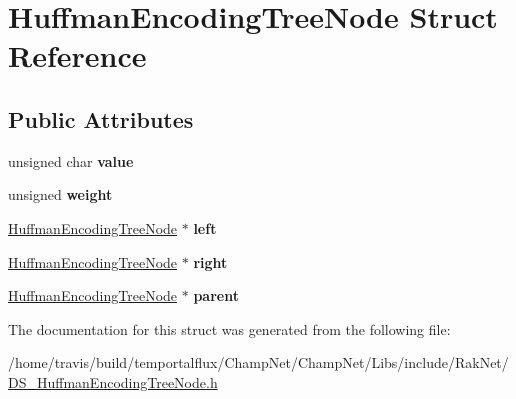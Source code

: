 \hypertarget{struct_huffman_encoding_tree_node}{\section{Huffman\-Encoding\-Tree\-Node Struct Reference}
\label{struct_huffman_encoding_tree_node}
}
\subsection*{Public Attributes}
\begin{DoxyCompactItemize}
\item 
\hypertarget{struct_huffman_encoding_tree_node_ab8e405870a5a080eebe7ad04a871618d}{unsigned char {\bfseries value}}\label{struct_huffman_encoding_tree_node_ab8e405870a5a080eebe7ad04a871618d}

\item 
\hypertarget{struct_huffman_encoding_tree_node_ad67b5b27458a18c0a7134999618087fe}{unsigned {\bfseries weight}}\label{struct_huffman_encoding_tree_node_ad67b5b27458a18c0a7134999618087fe}

\item 
\hypertarget{struct_huffman_encoding_tree_node_a25ce2e845c037728b1e95958495ddecb}{\hyperlink{struct_huffman_encoding_tree_node}{Huffman\-Encoding\-Tree\-Node} $\ast$ {\bfseries left}}\label{struct_huffman_encoding_tree_node_a25ce2e845c037728b1e95958495ddecb}

\item 
\hypertarget{struct_huffman_encoding_tree_node_aa7ff9e97cdf09f7ce9be54d54e89bc4d}{\hyperlink{struct_huffman_encoding_tree_node}{Huffman\-Encoding\-Tree\-Node} $\ast$ {\bfseries right}}\label{struct_huffman_encoding_tree_node_aa7ff9e97cdf09f7ce9be54d54e89bc4d}

\item 
\hypertarget{struct_huffman_encoding_tree_node_a6776b51b7e9fe502e8d740aacb0d35d7}{\hyperlink{struct_huffman_encoding_tree_node}{Huffman\-Encoding\-Tree\-Node} $\ast$ {\bfseries parent}}\label{struct_huffman_encoding_tree_node_a6776b51b7e9fe502e8d740aacb0d35d7}

\end{DoxyCompactItemize}


The documentation for this struct was generated from the following file\-:\begin{DoxyCompactItemize}
\item 
/home/travis/build/temportalflux/\-Champ\-Net/\-Champ\-Net/\-Libs/include/\-Rak\-Net/\hyperlink{_d_s___huffman_encoding_tree_node_8h}{D\-S\-\_\-\-Huffman\-Encoding\-Tree\-Node.\-h}\end{DoxyCompactItemize}
